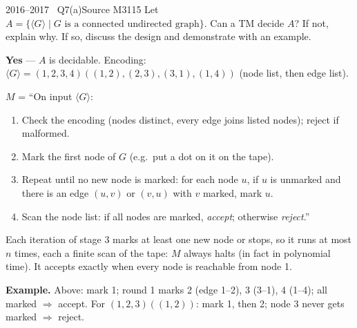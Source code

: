 \documentclass[11pt,a4paper]{article}
\begin{document}
\begin{question}{2016--2017 \textbullet\ Q7(a)}{Source M31}{15}
Let $A=\{\langle G\rangle\mid G \text{ is a connected undirected graph}\}$. Can a TM decide $A$? If not, explain why. If so, discuss the design and demonstrate with an example.
\end{question}
\begin{solution}
\textbf{Yes} --- $A$ is decidable. Encoding: $\langle G\rangle=(1,2,3,4)((1,2),(2,3),(3,1),(1,4))$ (node list, then edge list).

$M$ = ``On input $\langle G\rangle$:
\begin{enumerate}
\item Check the encoding (nodes distinct, every edge joins listed nodes); reject if malformed.
\item Mark the first node of $G$ (e.g.\ put a dot on it on the tape).
\item Repeat until no new node is marked: for each node $u$, if $u$ is unmarked and there is an edge $(u,v)$ or $(v,u)$ with $v$ marked, mark $u$.
\item Scan the node list: if all nodes are marked, \emph{accept}; otherwise \emph{reject}.''
\end{enumerate}
Each iteration of stage 3 marks at least one new node or stops, so it runs at most $n$ times, each a finite scan of the tape: $M$ always halts (in fact in polynomial time). It accepts exactly when every node is reachable from node 1.

\textbf{Example.} Above: mark 1; round 1 marks 2 (edge 1--2), 3 (3--1), 4 (1--4); all marked $\Rightarrow$ accept. For $(1,2,3)((1,2))$: mark 1, then 2; node 3 never gets marked $\Rightarrow$ reject.
\end{solution}
\end{document}
